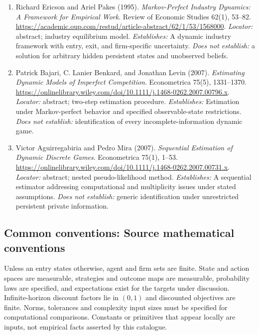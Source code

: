 \documentclass[11pt,a4paper]{article}
\begin{document}
\begin{enumerate}

\item[S1] Richard Ericson and Ariel Pakes (1995). \emph{Markov-Perfect Industry Dynamics: A Framework for Empirical Work}. Review of Economic Studies 62(1), 53--82. \url{https://academic.oup.com/restud/article-abstract/62/1/53/1568000}. \textit{Locator:} abstract; industry equilibrium model. \textit{Establishes:} A dynamic industry framework with entry, exit, and firm-specific uncertainty. \textit{Does not establish:} a solution for arbitrary hidden persistent states and unobserved beliefs.

\item[S2] Patrick Bajari, C. Lanier Benkard, and Jonathan Levin (2007). \emph{Estimating Dynamic Models of Imperfect Competition}. Econometrica 75(5), 1331--1370. \url{https://onlinelibrary.wiley.com/doi/10.1111/j.1468-0262.2007.00796.x}. \textit{Locator:} abstract; two-step estimation procedure. \textit{Establishes:} Estimation under Markov-perfect behavior and specified observable-state restrictions. \textit{Does not establish:} identification of every incomplete-information dynamic game.

\item[S3] Victor Aguirregabiria and Pedro Mira (2007). \emph{Sequential Estimation of Dynamic Discrete Games}. Econometrica 75(1), 1--53. \url{https://onlinelibrary.wiley.com/doi/10.1111/j.1468-0262.2007.00731.x}. \textit{Locator:} abstract; nested pseudo-likelihood method. \textit{Establishes:} A sequential estimator addressing computational and multiplicity issues under stated assumptions. \textit{Does not establish:} generic identification under unrestricted persistent private information.

\end{enumerate}

\subsection*{Common conventions: Source mathematical conventions}

Unless an entry states otherwise, agent and firm sets are finite. State and action spaces are measurable, strategies and outcome maps are measurable, probability laws are specified, and expectations exist for the targets under discussion. Infinite-horizon discount factors lie in $(0,1)$ and discounted objectives are finite. Norms, tolerances and complexity input sizes must be specified for computational comparisons. Constants or primitives that appear locally are inputs, not empirical facts asserted by this catalogue.
\end{document}
